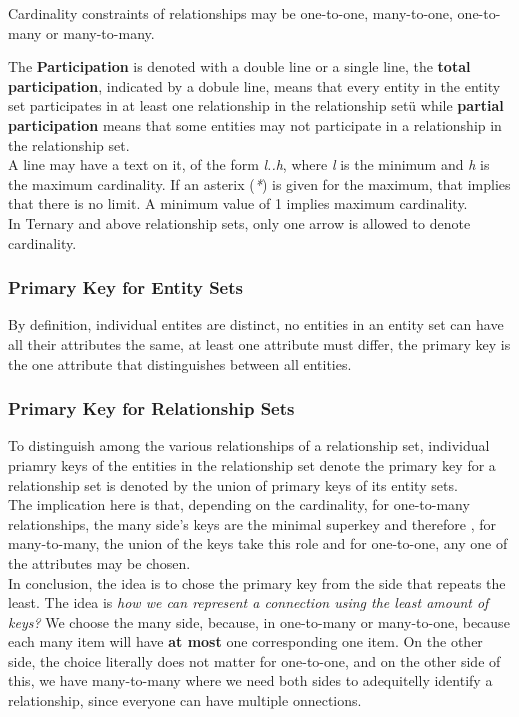 \documentclass[11pt,a4paper,twocolumn]{book}
\begin{document}
Cardinality constraints of relationships may be one-to-one, many-to-one, one-to-many or many-to-many.

The \textbf{Participation} is denoted with a double line or a single line, the \textbf{total participation}, indicated by a dobule line, means that every entity in the entity set participates in at least one relationship in the relationship setü while \textbf{partial participation} means that some entities may not participate in a relationship in the relationship set.\\

A line may have a text on it, of the form \textit{l..h}, where \textit{l} is the minimum and \textit{h} is the maximum cardinality. If an asterix (\textit{*}) is given for the maximum, that implies that there is no limit. A minimum value of 1 implies maximum cardinality.\\

In Ternary and above relationship sets, only one arrow is allowed to denote cardinality.

\subsubsection{Primary Key for Entity Sets}

By definition, individual entites are distinct, no entities in an entity set can have all their attributes the same, at least one attribute must differ, the primary key is the one attribute that distinguishes between all entities.

\subsubsection{Primary Key for Relationship Sets}

To distinguish among the various relationships of a relationship set, individual priamry keys of the entities in the relationship set denote the primary key for a relationship set is denoted by the union of primary keys of its entity sets.\\

The implication here is that, depending on the cardinality, for one-to-many relationships, the many side's keys are the minimal superkey and therefore , for many-to-many, the union of the keys take this role and for one-to-one, any one of the attributes may be chosen. \unsure \\

In conclusion, the idea is to chose the primary key from the side that repeats the least. The idea is \textit{how we can represent a connection using the least amount of keys?} We choose the many side, because, in one-to-many or many-to-one, because each many item will have \textbf{at most} one corresponding one item. On the other side, the choice literally does not matter for one-to-one, and on the other side of this, we have many-to-many where we need both sides to adequitelly identify a relationship, since everyone can have multiple onnections.
\end{document}
